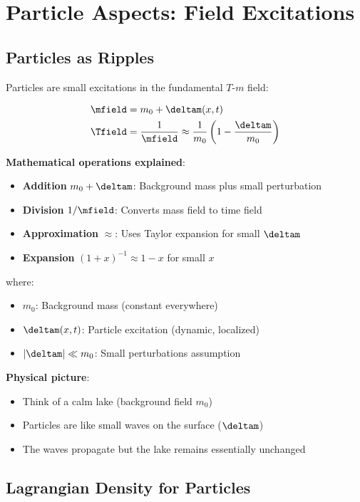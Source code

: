 	\section{Particle Aspects: Field Excitations}
	
	\subsection{Particles as Ripples}
	
	Particles are small excitations in the fundamental $T$-$m$ field:
	
	\begin{align}
		\mfield &= m_0 + \deltam(x,t) \\
		\Tfield &= \frac{1}{\mfield} \approx \frac{1}{m_0}\left(1 - \frac{\deltam}{m_0}\right)
	\end{align}
	
	\textbf{Mathematical operations explained}:
	\begin{itemize}
		\item \textbf{Addition} $m_0 + \deltam$: Background mass plus small perturbation
		\item \textbf{Division} $1/\mfield$: Converts mass field to time field
		\item \textbf{Approximation} $\approx$: Uses Taylor expansion for small $\deltam$
		\item \textbf{Expansion} $(1 + x)^{-1} \approx 1 - x$ for small $x$
	\end{itemize}
	
	where:
	\begin{itemize}
		\item $m_0$: Background mass (constant everywhere)
		\item $\deltam(x,t)$: Particle excitation (dynamic, localized)
		\item $|\deltam| \ll m_0$: Small perturbations assumption
	\end{itemize}
	
	\textbf{Physical picture}: 
	\begin{itemize}
		\item Think of a calm lake (background field $m_0$)
		\item Particles are like small waves on the surface ($\deltam$)
		\item The waves propagate but the lake remains essentially unchanged
	\end{itemize}
	
	\subsection{Lagrangian Density for Particles}
	
